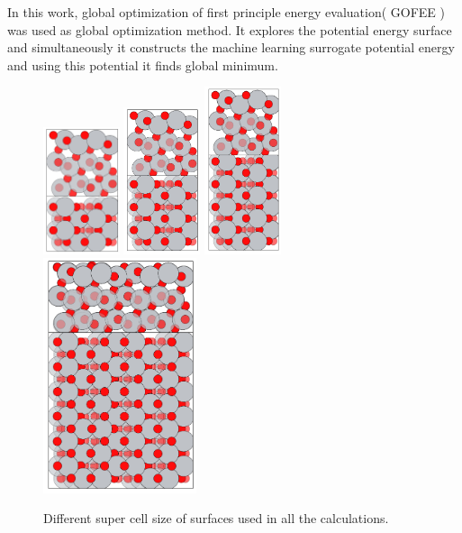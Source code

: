 \documentclass[aip,amsmath,amssymb,reprint, jcp]{revtex4-1}
\begin{document}
In this work, global optimization of first principle energy evaluation( GOFEE ) was used as global optimization method. It explores the potential energy surface and simultaneously it constructs the machine learning surrogate potential energy and using this potential it finds global minimum.

\begin{figure}
\centering
\includegraphics[width=0.2\textwidth]{TiO2_101sur_2by1supercell.png}
\includegraphics[width=0.2\textwidth]{TiO2_101sur_3by1supercell.png}
\includegraphics[width=0.2\textwidth]{TiO2_101sur_4by1supercell.png}
\includegraphics[width=0.4\textwidth]{TiO2_101sur_6by2supercell.png}
\caption{Different super cell size of surfaces used in all the calculations.}
\label{fig:supercells}
\end{figure}
\end{document}
